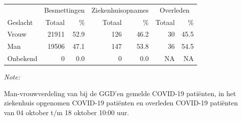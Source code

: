 \documentclass[
  english,
  man,floatsintext]{apa6}
\begin{document}
\begin{table}
\centering\begingroup\fontsize{11}{13}\selectfont

\begin{threeparttable}
\begin{tabular}{lrrrrrr}
\toprule
\multicolumn{1}{c}{ } & \multicolumn{2}{c}{Besmettingen} & \multicolumn{2}{c}{Ziekenhuisopnames} & \multicolumn{2}{c}{Overleden} \\
\cmidrule(l{3pt}r{3pt}){2-3} \cmidrule(l{3pt}r{3pt}){4-5} \cmidrule(l{3pt}r{3pt}){6-7}
Geslacht & Totaal & \% & Totaal & \% & Totaal & \%\\
\midrule
Vrouw & 21911 & 52.9 & 126 & 46.2 & 30 & 45.5\\
Man & 19506 & 47.1 & 147 & 53.8 & 36 & 54.5\\
Onbekend & 0 & 0.0 & 0 & 0.0 & NA & NA\\
\bottomrule
\end{tabular}
\begin{tablenotes}
\item \textit{Note: } 
\item Man-vrouwverdeling van bij de GGD’en gemelde COVID-19 patiënten, in het ziekenhuis opgenomen COVID-19 patiënten en overleden COVID-19 patiënten van 04 oktober t/m 18 oktober 10:00 uur.
\end{tablenotes}
\end{threeparttable}
\endgroup{}
\end{table}
\newpage
\end{document}
